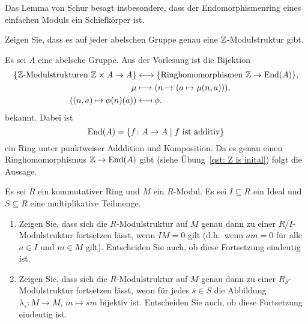 \begin{remark*}
  Das Lemma von Schur besagt insbesondere, dass der Endomorphismenring eines einfachen Moduls ein Schiefkörper ist.
\end{remark*}


\begin{question}[subtitle = $\Integer$-Moduln und abelsche Gruppen]
  \label{question: abelian groups are the same as modules over Z}
  Zeigen Sie, dass es auf jeder abelschen Gruppe genau eine $\Integer$-Modulstruktur gibt.
\end{question}


\begin{solution}
  Es sei $A$ eine abelsche Gruppe.
  Aus der Vorlesung ist die Bijektion
  \begin{align*}
    \{\text{$\mathbb{Z}$-Modulstrukturen $\mathbb{Z} \times A \to A$}\}
    &\longleftrightarrow
    \{\text{Ringhomomorphismen $\mathbb{Z} \to \operatorname{End}(A)$}\},
    \\
                    \mu
    &\longmapsto    (n \mapsto (a \mapsto \mu(n,a))),
    \\
                    ( (n,a) \mapsto \phi(n)(a) )
    &\longmapsfrom  \phi.
  \end{align*}
  bekannt.
  Dabei ist
  \[
      \operatorname{End}(A)
    = \{f \colon A \to A \mid \text{$f$ ist additiv}\}
  \]
  ein Ring unter punktweiser Adddition und Komposition.
  Da es genau einen Ringhomomorphismus $\mathbb{Z} \to \operatorname{End}(A)$ gibt (siehe Übung~\ref{qst: Z is inital}) folgt die Aussage.
\end{solution}


\begin{question}[subtitle = Moduln über Lokalisierungen und Quotienten]
  \label{question: extension of module structures onto quotients and localizations}
  Es sei $R$ ein kommutativer Ring und $M$ ein $R$-Modul.
  Es sei $I \subseteq R$ ein Ideal und $S \subseteq R$ eine multiplikative Teilmenge.
  \begin{enumerate}
    \item
      Zeigen Sie, dass sich die $R$-Modulstruktur auf $M$ genau dann zu einer $R/I$-Modulstruktur fortsetzen lässt, wenn $IM =  0$ gilt (d.h.\ wenn $am = 0$ für alle $a \in I$ und $m \in M$ gilt).
      Entscheiden Sie auch, ob diese Fortsetzung eindeutig ist.
    \item
      Zeigen Sie, dass sich die $R$-Modulstruktur auf $M$ genau dann zu einer $R_S$-Modulstruktur fortsetzen lässt, wenn für jedes $s \in S$ die Abbildung $\lambda_s \colon M \to M$, $m \mapsto sm$ bijektiv ist.
      Entscheiden Sie auch, ob diese Fortsetzung eindeutig ist.
  \end{enumerate}
\end{question}


